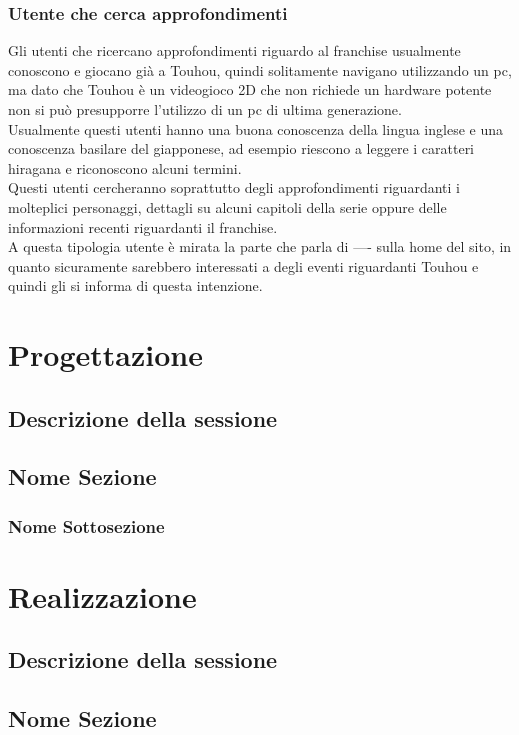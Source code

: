\documentclass[openany, a4paper, 12pt]{report}
\begin{document}
	\subsection{Utente che cerca approfondimenti}
	Gli utenti che ricercano approfondimenti riguardo al franchise usualmente conoscono e giocano già a Touhou, quindi solitamente navigano utilizzando un pc, ma dato che Touhou è un videogioco 2D che non richiede un hardware potente non si può presupporre l'utilizzo di un pc di ultima generazione.\\
	Usualmente questi utenti hanno una buona conoscenza della lingua inglese e una conoscenza basilare del giapponese, ad esempio riescono a leggere i caratteri hiragana e riconoscono alcuni termini.\\
	Questi utenti cercheranno soprattutto degli approfondimenti riguardanti i molteplici personaggi, dettagli su alcuni capitoli della serie oppure delle informazioni recenti riguardanti il franchise.\\
	A questa tipologia utente è mirata la parte che parla di ---- sulla home del sito, in quanto sicuramente sarebbero interessati a degli eventi riguardanti Touhou e quindi gli si informa di questa intenzione.
	
	\chapter{Progettazione}
	\section{Descrizione della sessione}
	\section{Nome Sezione}
	\subsection{Nome Sottosezione}
	
	\chapter{Realizzazione}
	\section{Descrizione della sessione}
	\section{Nome Sezione}
\end{document}
